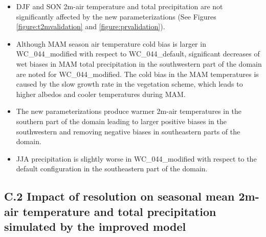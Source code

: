 \documentclass[a0b,landscape]{a0poster}
\begin{document}
\begin{multicols*}{4}
\begin{itemize}
  \item DJF and SON 2m-air temperature and total precipitation are not significantly
  affected by the new parameterizations (See Figures \ref{figure:t2mvalidation} and \ref{figure:prvalidation}).
  \item Although MAM season air temperature cold bias is larger in WC\_044\_modified with respect to WC\_044\_default,
  significant decreases of wet biases in MAM total precipitation in the southwestern part of the domain are noted for  WC\_044\_modified.
  The cold bias in the MAM temperatures is caused by the slow growth rate in the vegetation scheme, which leads to higher albedos and cooler temperatures during MAM.
  \item The new parameterizations produce warmer 2m-air temperatures in the southern part
  of the domain leading to larger positive biases in the southwestern and removing negative biases in
  southeastern parts of the domain.
  \item JJA precipitation is slightly worse in WC\_044\_modified with respect to
  the default configuration in the southeastern part of the domain.
\end{itemize}

\subsection*{C.2 Impact of resolution on seasonal mean 2m-air temperature and total precipitation simulated by the improved model}
\noindent
\begin{minipage}[t]{\linewidth}

\end{minipage}


\end{multicols*}
\end{document}
